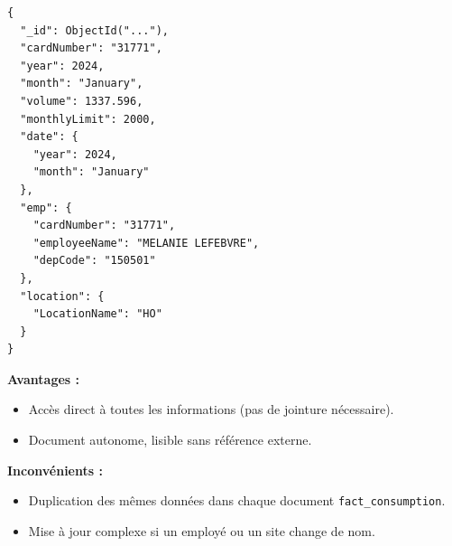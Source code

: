 \documentclass[a4paper,11pt]{report}
\begin{document}
\vspace{0.5em}
\begin{tcolorbox}[colback=blue!5!white,colframe=blue!40!black,title={\texttt{embedding} : dimensions imbriquées}]
  \begin{verbatim}
{
  "_id": ObjectId("..."),
  "cardNumber": "31771",
  "year": 2024,
  "month": "January",
  "volume": 1337.596,
  "monthlyLimit": 2000,
  "date": {
    "year": 2024,
    "month": "January"
  },
  "emp": {
    "cardNumber": "31771",
    "employeeName": "MELANIE LEFEBVRE",
    "depCode": "150501"
  },
  "location": {
    "LocationName": "HO"
  }
}
  \end{verbatim}

  \textbf{Avantages :}
  \begin{itemize}[leftmargin=1.2em]
    \item Accès direct à toutes les informations (pas de jointure nécessaire).  
    \item Document autonome, lisible sans référence externe.  
  \end{itemize}

  \textbf{Inconvénients :}
  \begin{itemize}[leftmargin=1.2em]
    \item Duplication des mêmes données dans chaque document \texttt{fact\_consumption}.  
    \item Mise à jour complexe si un employé ou un site change de nom.  
  \end{itemize}
\end{tcolorbox}
\end{document}
